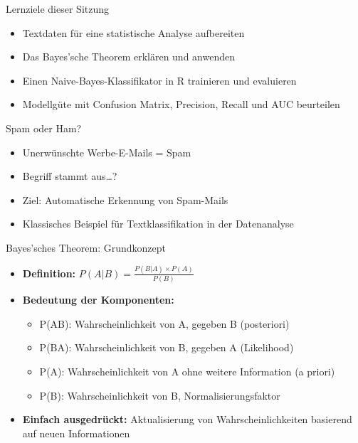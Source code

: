 \documentclass[
  ignorenonframetext,
]{beamer}
\providecommand{\tightlist}{%
  \setlength{\itemsep}{0pt}\setlength{\parskip}{0pt}}
\begin{document}
\begin{frame}{Lernziele dieser Sitzung}
\protect{}\label{lernziele-dieser-sitzung-11}
\begin{itemize}
\tightlist
\item
  Textdaten für eine statistische Analyse aufbereiten
\item
  Das Bayes'sche Theorem erklären und anwenden
\item
  Einen Naive-Bayes-Klassifikator in R trainieren und evaluieren
\item
  Modellgüte mit Confusion Matrix, Precision, Recall und AUC beurteilen
\end{itemize}
\end{frame}

\begin{frame}{Spam oder Ham?}
\protect{}\label{spam-oder-ham}
\begin{itemize}
\tightlist
\item
  Unerwünschte Werbe-E-Mails = Spam
\item
  Begriff stammt aus\ldots?
\item
  Ziel: Automatische Erkennung von Spam-Mails
\item
  Klassisches Beispiel für Textklassifikation in der Datenanalyse
\end{itemize}
\end{frame}

\begin{frame}{Bayes'sches Theorem: Grundkonzept}
\protect{}\label{bayessches-theorem-grundkonzept}
\begin{itemize}
\tightlist
\item
  \textbf{Definition:} \(P(A|B) = \frac{P(B|A) \times P(A)}{P(B)}\)
\item
  \textbf{Bedeutung der Komponenten:}

  \begin{itemize}
  \tightlist
  \item
    P(A\textbar B): Wahrscheinlichkeit von A, gegeben B (posteriori)
  \item
    P(B\textbar A): Wahrscheinlichkeit von B, gegeben A (Likelihood)
  \item
    P(A): Wahrscheinlichkeit von A ohne weitere Information (a priori)
  \item
    P(B): Wahrscheinlichkeit von B, Normalisierungsfaktor
  \end{itemize}
\item
  \textbf{Einfach ausgedrückt:} Aktualisierung von Wahrscheinlichkeiten
  basierend auf neuen Informationen
\end{itemize}
\end{frame}
\end{document}
